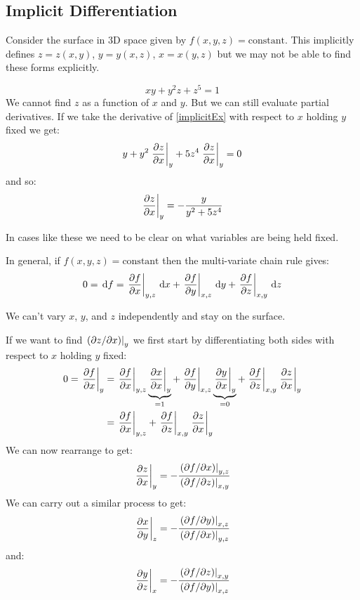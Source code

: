\documentclass[../main.tex]{subfiles}
\begin{document}
\subsection{Implicit Differentiation}
Consider the surface in 3D space given by $f(x, y, z) = \text{constant}$.
This implicitly defines $z = z(x, y)$, $y = y(x, z)$, $x = x(y, z)$ but we may not be able to find these forms explicitly.
\begin{example}
\begin{equation}
  xy + y^2 z + z^5 = 1
  \label{implicitEx}
\end{equation}
We cannot find $z$ as a function of $x$ and $y$.
But we can still evaluate partial derivatives.
If we take the derivative of \cref{implicitEx} with respect to $x$ holding $y$ fixed we get:
\[
  y + y^2 \at{\pderiv{z}{x}}{y} + 5z^4 \at{\pderiv{z}{x}}{y} = 0
\]
and so:
\[
  \at{\pderiv{z}{x}}{y} = -\frac{y}{y^2 + 5z^4}
\]
\end{example}
\begin{remark}[Warning]
  In cases like these we need to be clear on what variables are being held fixed.
\end{remark}
In general, if $f(x, y, z) = \text{constant}$ then the multi-variate chain rule gives:
\[
  0 = \d{f} = \at{\pderiv{f}{x}}{y, z} \d{x} + \at{\pderiv{f}{y}}{x, z} \d{y} + \at{\pderiv{f}{z}}{x, y} \d{z}
\]
\begin{remark}[Warning]
We can't vary $x$, $y$, and $z$ independently and stay on the surface.
\end{remark}
If we want to find $\left. (\partial z/\partial x) \right|_{y}$ we first start by differentiating both sides with respect to $x$ holding $y$ fixed:
\begin{align*}
  0 = \at{\pderiv{f}{x}}{y} &= \at{\pderiv{f}{x}}{y,z} \underbrace{\at{\pderiv{x}{x}}{y}}_{=1} + \at{\pderiv{f}{y}}{x,z} \underbrace{\at{\pderiv{y}{x}}{y}}_{=0} + \at{\pderiv{f}{z}}{x, y} \at{\pderiv{z}{x}}{y} \\
                            &=\at{\pderiv{f}{x}}{y,z} + \at{\pderiv{f}{z}}{x, y} \at{\pderiv{z}{x}}{y} \\
\end{align*}
We can now rearrange to get:
\[
  \at{\pderiv{z}{x}}{y} = -\frac{\at{(\partial f/\partial x)}{y, z}}{\at{(\partial f/\partial z)}{x, y}}
\]
We can carry out a similar process to get:
\[
  \at{\pderiv{x}{y}}{z} = -\frac{\at{(\partial f/\partial y)}{x, z}}{\at{(\partial f/\partial x)}{y, z}}
\]
and:
\[
  \at{\pderiv{y}{z}}{x} = -\frac{\at{(\partial f/\partial z)}{x, y}}{\at{(\partial f/\partial y)}{x, z}}
\]
\end{document}
